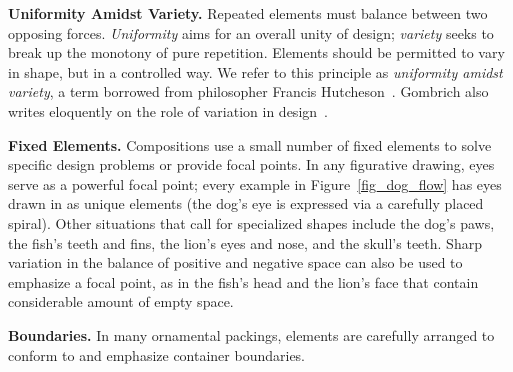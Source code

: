 \begin{items}
\item \textbf{Uniformity Amidst Variety.} Repeated elements must balance
  between two opposing forces.  \textit{Uniformity} 
  aims for an overall unity of design; \textit{variety}
  seeks to break up the monotony of
  pure repetition.  Elements should be permitted to vary in shape,
  but in a controlled way.  We refer to this principle
  as \textit{uniformity amidst variety}, a term borrowed from 
  philosopher Francis Hutcheson~\cite{Hutcheson1729}.
  Gombrich also writes eloquently on the role of variation in 
  design~\cite{Gombrich}.

\item \textbf{Fixed Elements.} Compositions use a small number of fixed
  elements to solve specific design problems or provide focal points.
  In any figurative drawing, eyes serve as a powerful focal point;
  every example in Figure~\ref{fig_dog_flow} has eyes drawn
  in as unique elements
  (the dog's eye is expressed via a carefully placed spiral).  Other
  situations that call for specialized shapes include the dog's paws,
  the fish's teeth and fins, 
  the lion's eyes and nose, %
  and the skull's teeth.
  Sharp variation in the balance of positive and negative space
  can also be used to emphasize a focal point,
  as in the fish's head and the lion's face that contain considerable amount of empty space.

\item \textbf{Boundaries.} In many ornamental packings, elements are
  carefully arranged to conform to and emphasize container boundaries.
\end{items}


